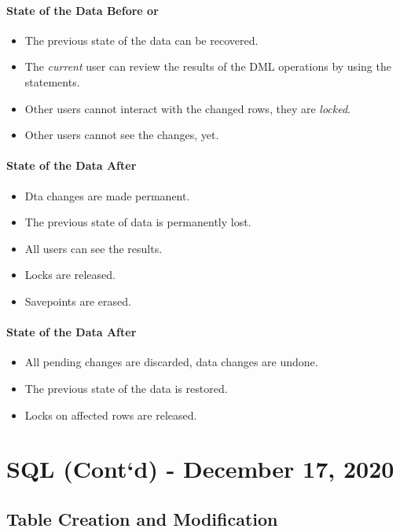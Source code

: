 \documentclass[11pt,a4paper,twocolumn]{book}
\begin{document}
\subsubsection{State of the Data Before  or }

\begin{itemize}
\item The previous state of the data can be recovered.
\item The \textit{current} user can review the results of the DML operations by using the  statements.
\item Other users cannot interact with the changed rows, they are \textit{locked}.
\item Other users cannot see the changes, yet.
\end{itemize}

\subsubsection{State of the Data After }

\begin{itemize}
\item Dta changes are made permanent.
\item The previous state of data is permanently lost.
\item All users can see the results.
\item Locks are released.
\item Savepoints are erased.
\end{itemize}

\subsubsection{State of the Data After }

\begin{itemize}
\item All pending changes are discarded, data changes are undone.
\item The previous state of the data is restored.
\item Locks on affected rows are released.
\end{itemize}

\chapter{SQL (Cont`d) - December 17, 2020}

\section{Table Creation and Modification}
\end{document}
